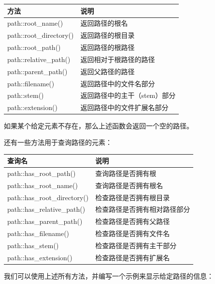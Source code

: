 \begin{table}[H]
\centering
\begin{tabularx}{\textwidth}{>{\ttfamily\raggedright\arraybackslash}X >{\raggedright\arraybackslash}X}
\toprule
方法 & 说明 \\
\midrule
path::root\_name() & 返回路径的根名 \\
path::root\_directory() & 返回路径的根目录 \\
path::root\_path() & 返回路径的根路径 \\
path::relative\_path() & 返回相对于根路径的路径 \\
path::parent\_path() & 返回父路径的路径 \\
path::filename() & 返回路径中的文件名部分 \\
path::stem() & 返回路径中的主干（stem）部分 \\
path::extension() & 返回路径中的文件扩展名部分 \\
\bottomrule
\end{tabularx}
\end{table}

如果某个给定元素不存在，那么上述函数会返回一个空的路径。

还有一些方法用于查询路径的元素：

\begin{table}[H]
\centering
\begin{tabularx}{\textwidth}{>{\ttfamily\raggedright\arraybackslash}X >{\raggedright\arraybackslash}X}
\toprule
查询名 & 说明 \\
\midrule
path::has\_root\_path() & 查询路径是否拥有根 \\
path::has\_root\_name() & 查询路径是否拥有根名 \\
path::has\_root\_directory() & 检查路径是否拥有根目录 \\
path::has\_relative\_path() & 检查路径是否拥有相对路径部分 \\
path::has\_parent\_path() & 检查路径是否拥有父路径 \\
path::has\_filename() & 检查路径是否拥有文件名 \\
path::has\_stem() & 检查路径是否拥有主干部分 \\
path::has\_extension() & 检查路径是否拥有扩展名 \\
\bottomrule
\end{tabularx}
\end{table}

我们可以使用上述所有方法，并编写一个示例来显示给定路径的信息：

